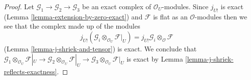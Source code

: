 \documentclass[10pt,a4paper]{amsart}
\theoremstyle{plain}
\theoremstyle{definition}
\theoremstyle{remark}
\numberwithin{equation}{subsection}
\begin{document}
\begin{proof}
Let $\mathcal{G}_1 \to \mathcal{G}_2 \to \mathcal{G}_3$ be
an exact complex of $\mathcal{O}_U$-modules.
Since $j_{U!}$ is exact (Lemma \ref{lemma-extension-by-zero-exact})
and $\mathcal{F}$ is flat as an $\mathcal{O}$-modules
then we see that the complex made up of the modules
$$
j_{U!}(\mathcal{G}_i \otimes_{\mathcal{O}_U} \mathcal{F}|_U) =
j_{U!}\mathcal{G}_i \otimes_\mathcal{O} \mathcal{F}
$$
(Lemma \ref{lemma-j-shriek-and-tensor}) is exact. We conclude that
$\mathcal{G}_1 \otimes_{\mathcal{O}_U} \mathcal{F}|_U \to
\mathcal{G}_2 \otimes_{\mathcal{O}_U} \mathcal{F}|_U \to
\mathcal{G}_3 \otimes_{\mathcal{O}_U} \mathcal{F}|_U$
is exact by
Lemma \ref{lemma-j-shriek-reflects-exactness}.
\end{proof}
\end{document}
